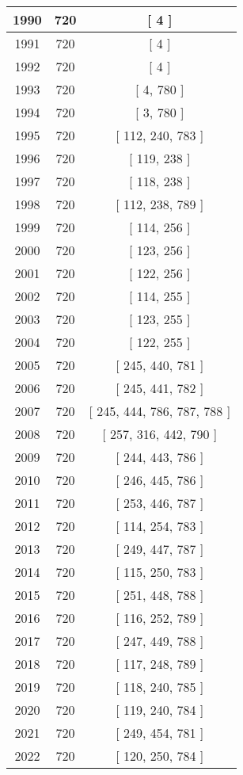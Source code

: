\begin{center}
\begin{longtable}[H]{|| c c c ||}
1990 & 720 & [ 4 ] \\ 
\hline
1991 & 720 & [ 4 ] \\ 
\hline
1992 & 720 & [ 4 ] \\ 
\hline
1993 & 720 & [ 4, 780 ] \\ 
\hline
1994 & 720 & [ 3, 780 ] \\ 
\hline
1995 & 720 & [ 112, 240, 783 ] \\ 
\hline
1996 & 720 & [ 119, 238 ] \\ 
\hline
1997 & 720 & [ 118, 238 ] \\ 
\hline
1998 & 720 & [ 112, 238, 789 ] \\ 
\hline
1999 & 720 & [ 114, 256 ] \\ 
\hline
2000 & 720 & [ 123, 256 ] \\ 
\hline
2001 & 720 & [ 122, 256 ] \\ 
\hline
2002 & 720 & [ 114, 255 ] \\ 
\hline
2003 & 720 & [ 123, 255 ] \\ 
\hline
2004 & 720 & [ 122, 255 ] \\ 
\hline
2005 & 720 & [ 245, 440, 781 ] \\ 
\hline
2006 & 720 & [ 245, 441, 782 ] \\ 
\hline
2007 & 720 & [ 245, 444, 786, 787, 788 ] \\ 
\hline
2008 & 720 & [ 257, 316, 442, 790 ] \\ 
\hline
2009 & 720 & [ 244, 443, 786 ] \\ 
\hline
2010 & 720 & [ 246, 445, 786 ] \\ 
\hline
2011 & 720 & [ 253, 446, 787 ] \\ 
\hline
2012 & 720 & [ 114, 254, 783 ] \\ 
\hline
2013 & 720 & [ 249, 447, 787 ] \\ 
\hline
2014 & 720 & [ 115, 250, 783 ] \\ 
\hline
2015 & 720 & [ 251, 448, 788 ] \\ 
\hline
2016 & 720 & [ 116, 252, 789 ] \\ 
\hline
2017 & 720 & [ 247, 449, 788 ] \\ 
\hline
2018 & 720 & [ 117, 248, 789 ] \\ 
\hline
2019 & 720 & [ 118, 240, 785 ] \\ 
\hline
2020 & 720 & [ 119, 240, 784 ] \\ 
\hline
2021 & 720 & [ 249, 454, 781 ] \\ 
\hline
2022 & 720 & [ 120, 250, 784 ] \\ 

\end{longtable}
\end{center}
